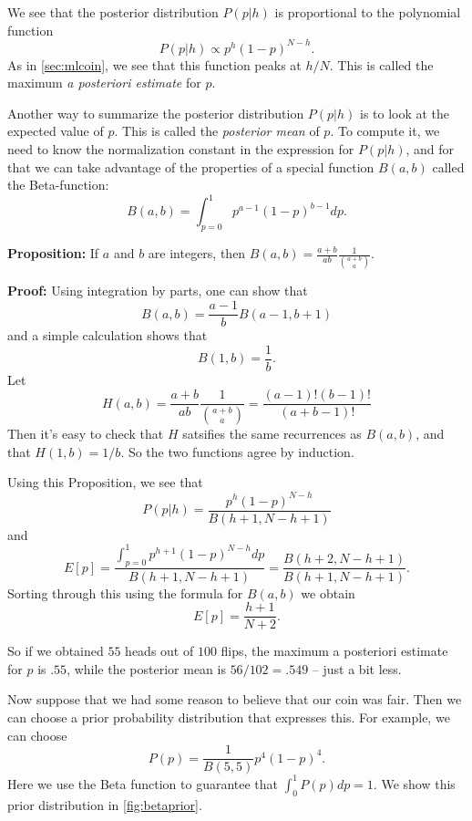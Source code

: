 \documentclass[
  oneside]{scrbook}
\begin{document}
We see that the posterior distribution \(P(p|h)\) is proportional to the
polynomial function \[
P(p|h)\propto p^{h}(1-p)^{N-h}.
\] As in \cref{sec:mlcoin}, we see that this function peaks at \(h/N\).
This is called the maximum \emph{a posteriori estimate} for \(p\).

Another way to summarize the posterior distribution \(P(p|h)\) is to
look at the expected value of \(p\). This is called the \emph{posterior
mean} of \(p\). To compute it, we need to know the normalization
constant in the expression for \(P(p|h)\), and for that we can take
advantage of the properties of a special function \(B(a,b)\) called the
Beta-function: \[
B(a,b) = \int_{p=0}^{1} p^{a-1}(1-p)^{b-1} dp.
\]

\textbf{Proposition:} If \(a\) and \(b\) are integers, then
\(B(a,b)=\frac{a+b}{ab}\frac{1}{\binom{a+b}{a}}\).

\textbf{Proof:} Using integration by parts, one can show that \[
B(a,b)=\frac{a-1}{b}B(a-1,b+1)
\] and a simple calculation shows that \[
B(1,b) = \frac{1}{b}.
\] Let \[
H(a,b)=\frac{a+b}{ab}\frac{1}{\binom{a+b}{a}} = \frac{(a-1)!(b-1)!}{(a+b-1)!}
\] Then it's easy to check that \(H\) satsifies the same recurrences as
\(B(a,b)\), and that \(H(1,b)=1/b\). So the two functions agree by
induction.

Using this Proposition, we see that \[
P(p|h) = \frac{p^{h}(1-p)^{N-h}}{B(h+1,N-h+1)}
\] and \[
E[p] = \frac{\int_{p=0}^{1} p^{h+1}(1-p)^{N-h}dp}{B(h+1,N-h+1)}=\frac{B(h+2,N-h+1)}{B(h+1,N-h+1)}.
\] Sorting through this using the formula for \(B(a,b)\) we obtain \[
E[p]=\frac{h+1}{N+2}.
\]

So if we obtained \(55\) heads out of \(100\) flips, the maximum a
posteriori estimate for \(p\) is \(.55\), while the posterior mean is
\(56/102=.549\) -- just a bit less.

Now suppose that we had some reason to believe that our coin was fair.
Then we can choose a prior probability distribution that expresses this.
For example, we can choose \[
P(p) = \frac{1}{B(5,5)}p^{4}(1-p)^{4}.
\] Here we use the Beta function to guarantee that
\(\int_{0}^{1}P(p)dp=1\). We show this prior distribution in
\cref{fig:betaprior}.
\end{document}
